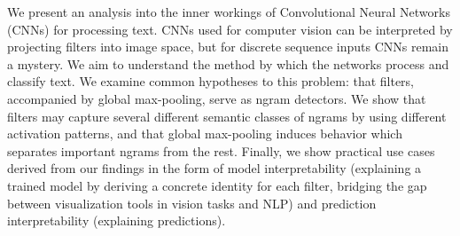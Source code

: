 We present an analysis into the inner workings of Convolutional Neural Networks (CNNs) for processing text. CNNs used for computer vision can be interpreted by projecting filters into image space, but for discrete sequence inputs CNNs remain a mystery. We aim to understand the method by which the networks process and classify text. We examine common hypotheses to this problem: that filters, accompanied by global max-pooling, serve as ngram detectors. We show that filters may capture several different semantic classes of ngrams by using different activation patterns, and that global max-pooling induces behavior which separates important ngrams from the rest. Finally, we show practical use cases derived from our findings in the form of model interpretability (explaining a trained model by deriving a concrete identity for each filter, bridging the gap between visualization tools in vision tasks and NLP) and prediction interpretability (explaining predictions).
